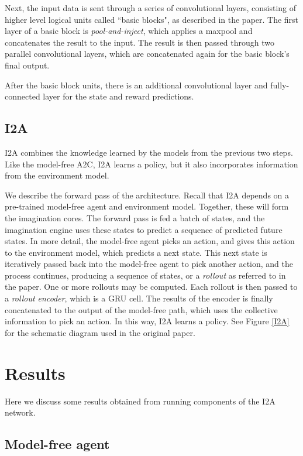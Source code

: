 \documentclass[10pt, twocolumn]{article}
\begin{document}
Next, the input data is sent through a series of convolutional layers, consisting of higher level logical units
called ``basic blocks", as described in the paper. The first layer of a basic block is \emph{pool-and-inject},
which applies a maxpool and concatenates the result to the input. The result is then passed through
two parallel convolutional layers, which are concatenated again for the basic block's final output.

After the basic block units, there is an additional convolutional layer and fully-connected layer for the
state and reward predictions.



\subsection{I2A}

I2A combines the knowledge learned by the models from the previous two steps. Like the model-free A2C, I2A learns a policy, but it also incorporates information from the environment model.

We describe the forward pass of the architecture. Recall that I2A depends on a pre-trained model-free agent and environment model. Together, these will form the imagination cores. The forward pass is fed a batch of states, and the imagination engine uses these states to predict a sequence of predicted future states. In more detail, the model-free agent picks an action, and gives this action to the environment model, which predicts a next state. This next state is iteratively passed back into the model-free agent to pick another action, and the process continues, producing a sequence of states, or a \emph{rollout} as referred to in the paper. One or more rollouts may be computed. Each rollout is then passed to a \emph{rollout encoder}, which is a GRU cell. The results of the encoder is finally concatenated to the output of the model-free path, which uses the collective information to pick an action. In this way, I2A learns a policy. See Figure \ref{I2A} for the schematic diagram used in the original paper.

\section{Results}

Here we discuss some results obtained from running components of the I2A network.

\subsection{Model-free agent}
\end{document}
